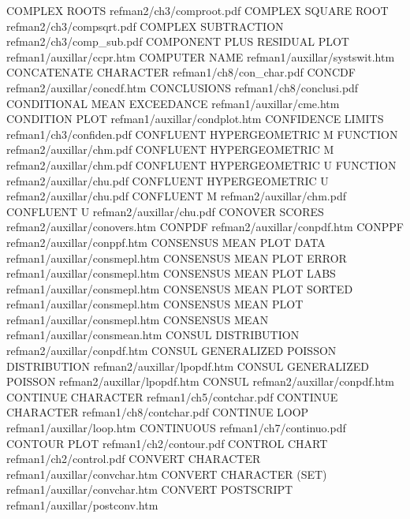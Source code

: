 COMPLEX ROOTS                           refman2/ch3/comproot.pdf
COMPLEX SQUARE ROOT                     refman2/ch3/compsqrt.pdf
COMPLEX SUBTRACTION                     refman2/ch3/comp_sub.pdf
COMPONENT PLUS RESIDUAL PLOT            refman1/auxillar/ccpr.htm
COMPUTER NAME                           refman1/auxillar/systswit.htm
CONCATENATE CHARACTER                   refman1/ch8/con_char.pdf
CONCDF                                  refman2/auxillar/concdf.htm
CONCLUSIONS                             refman1/ch8/conclusi.pdf
CONDITIONAL MEAN EXCEEDANCE             refman1/auxillar/cme.htm
CONDITION PLOT                          refman1/auxillar/condplot.htm
CONFIDENCE LIMITS                       refman1/ch3/confiden.pdf
CONFLUENT HYPERGEOMETRIC M FUNCTION     refman2/auxillar/chm.pdf
CONFLUENT HYPERGEOMETRIC M              refman2/auxillar/chm.pdf
CONFLUENT HYPERGEOMETRIC U FUNCTION     refman2/auxillar/chu.pdf
CONFLUENT HYPERGEOMETRIC U              refman2/auxillar/chu.pdf
CONFLUENT M                             refman2/auxillar/chm.pdf
CONFLUENT U                             refman2/auxillar/chu.pdf
CONOVER SCORES                          refman2/auxillar/conovers.htm
CONPDF                                  refman2/auxillar/conpdf.htm
CONPPF                                  refman2/auxillar/conppf.htm
CONSENSUS MEAN PLOT DATA                refman1/auxillar/consmepl.htm
CONSENSUS MEAN PLOT ERROR               refman1/auxillar/consmepl.htm
CONSENSUS MEAN PLOT LABS                refman1/auxillar/consmepl.htm
CONSENSUS MEAN PLOT SORTED              refman1/auxillar/consmepl.htm
CONSENSUS MEAN PLOT                     refman1/auxillar/consmepl.htm
CONSENSUS MEAN                          refman1/auxillar/consmean.htm
CONSUL DISTRIBUTION                     refman2/auxillar/conpdf.htm
CONSUL GENERALIZED POISSON DISTRIBUTION refman2/auxillar/lpopdf.htm
CONSUL GENERALIZED POISSON              refman2/auxillar/lpopdf.htm
CONSUL                                  refman2/auxillar/conpdf.htm
CONTINUE CHARACTER                      refman1/ch5/contchar.pdf
CONTINUE CHARACTER                      refman1/ch8/contchar.pdf
CONTINUE LOOP                           refman1/auxillar/loop.htm
CONTINUOUS                              refman1/ch7/continuo.pdf
CONTOUR PLOT                            refman1/ch2/contour.pdf
CONTROL CHART                           refman1/ch2/control.pdf
CONVERT CHARACTER                       refman1/auxillar/convchar.htm
CONVERT CHARACTER (SET)                 refman1/auxillar/convchar.htm
CONVERT POSTSCRIPT                      refman1/auxillar/postconv.htm
